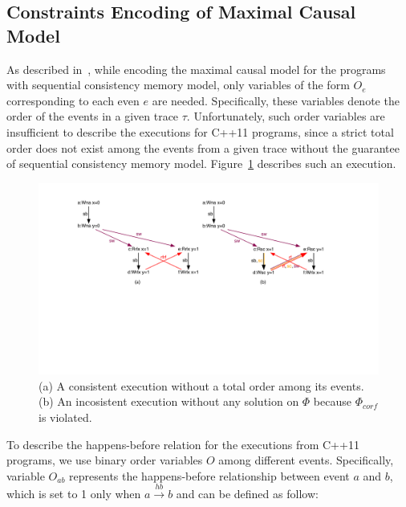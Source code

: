\documentclass[preprint, numbers, 10pt]{sigplanconf}
\begin{document}
\subsection{Constraints Encoding of Maximal Causal Model}
\label{sec:encode}

As described in~\cite{Huang:2015}, while encoding the maximal causal model 
for the programs with sequential consistency memory model, only variables of 
the form $O_e$ corresponding to each even $e$ are needed. Specifically,
these variables denote the order of the events in a given trace $\tau$. 
Unfortunately, such order variables are insufficient to describe the executions
for C++11 programs, since a strict total order does not exist among 
the events from a given trace without the guarantee of sequential consistency 
memory model. Figure~\ref{fig:noStrictOrder} describes such an execution. 

\begin{figure}%
\centering\includegraphics[scale=0.34]{noStrictOrder.pdf} %
\caption{(a) A consistent execution without a total order among
its events. (b) An incosistent execution without any solution
on $\Phi$ because $\Phi_{corf}$ is violated. }
\label{fig:noStrictOrder}
\end{figure}

To describe the happens-before relation for the executions from C++11 programs, 
we use binary order variables $O$ among different events.
Specifically, variable $O_{ab}$ represents the happens-before
relationship between event $a$ and $b$, which is set to 1 only when 
$a \stackrel{hb}{\longrightarrow} b$ and 
can be defined as follow: 
\end{document}
